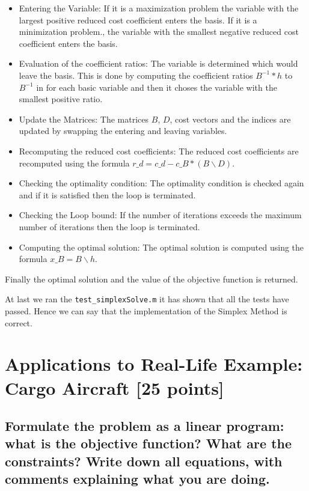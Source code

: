 \documentclass[unicode,11pt,a4paper,oneside,numbers=endperiod,openany]{scrartcl}
\begin{document}
\begin{itemize}
	\item Entering the Variable: If it is a maximization problem the variable with the largest positive reduced cost coefficient enters the basis. If it is a minimization problem., the variable with the smallest negative reduced cost coefficient enters the basis.
	\item Evaluation of the coefficient ratios: The variable is determined which would leave the basis. This is done by computing the coefficient ratios $B^{-1}*h$ to $B^{-1}$ in for each basic variable and then it choses the variable with the smallest positive ratio.
	\item Update the Matrices: The matrices $B$, $D$, cost vectors and the indices are updated by swapping the entering and leaving variables.
	\item Recomputing the reduced cost coefficients: The reduced cost coefficients are recomputed using the formula $r\_d = c\_d - c\_B * (B \backslash D)$.
	\item Checking the optimality condition: The optimality condition is checked again and if it is satisfied then the loop is terminated.
	\item Checking the Loop bound: If the number of iterations exceeds the maximum number of iterations then the loop is terminated.
	\item Computing the optimal solution: The optimal solution is computed using the formula $x\_B = B \backslash h$.
\end{itemize}

Finally the optimal solution and the value of the objective function is returned.



At last we ran the \texttt{test\_simplexSolve.m} it has shown that all the tests have passed. Hence we can say that the implementation of the Simplex Method is correct.

\section{Applications to Real-Life Example: Cargo Aircraft [25 points]}
\subsection{Formulate the problem as a linear program: what is the objective function? What are the constraints?
	Write down all equations, with comments explaining what you are doing.}
\end{document}
